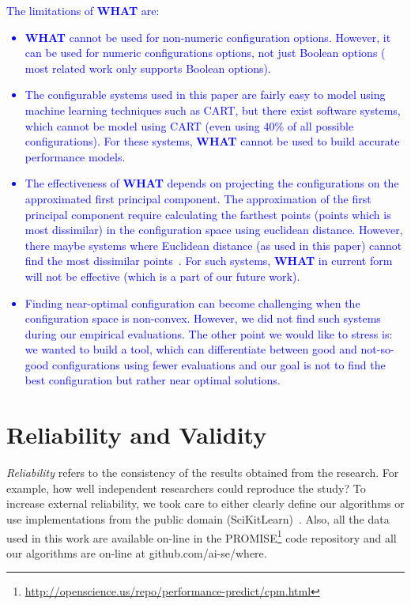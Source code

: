 \documentclass[smallextended]{svjour3}       %
\newcommand{\what}{{\bf WHAT}\xspace}
\begin{document}
\textcolor{blue}{The limitations of \what{} are:
\begin{itemize}
    \item \what{} cannot be used for non-numeric configuration options. However, it can be used for numeric configurations options, not just Boolean options ( most related work only supports Boolean options). 
    \item The configurable systems used in this paper are fairly easy to model using machine learning techniques such as CART, but there exist software systems, which cannot be model using CART (even using 40\% of all possible configurations). For these systems, \what{} cannot be used to build accurate performance models.
    \item The effectiveness of \what{} depends on projecting the configurations on the approximated first principal component. The approximation of the first principal component require calculating the farthest points (points which is most dissimilar)  in the configuration space using euclidean distance. However, there maybe systems where  Euclidean distance (as used in this paper) cannot  find the most dissimilar points~\cite{chen2016sampling}. For such systems, \what{} in current form will not be effective (which is a part of our future work).
    \item Finding near-optimal configuration can become challenging when the configuration space is non-convex. However, we did not find such systems during our empirical evaluations. The other point we would like to stress is: we wanted to build a tool, which can differentiate between good and not-so-good configurations using fewer evaluations and our goal is not to find the best configuration but rather near optimal solutions.
\end{itemize}
}



\section{Reliability and Validity}\label{sect:construct}

{\em Reliability} refers to the consistency of the results obtained
from the research.  For example,   how well independent researchers
could reproduce the study? To increase external
reliability, we took care to either  clearly define our
algorithms or use implementations from the public domain
(SciKitLearn)~\cite{scikit-learn}. Also, all the data used in this work are available
on-line in the PROMISE\footnote{\url{http://openscience.us/repo/performance-predict/cpm.html}} code repository and all our algorithms
are on-line at github.com/ai-se/where.
\end{document}

